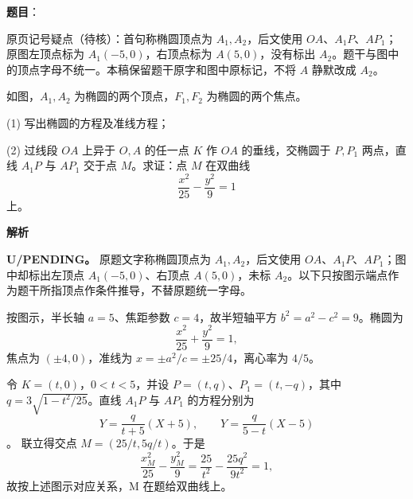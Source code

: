 \begin{answer}

\textbf{题目}：

\begin{gktip}
原页记号疑点（待核）：首句称椭圆顶点为 \(A_1,A_2\)，后文使用 \(OA\)、\(A_1P\)、\(AP_1\)；原图左顶点标为 \(A_1(-5,0)\)，右顶点标为 \(A(5,0)\)，没有标出 \(A_2\)。题干与图中的顶点字母不统一。本稿保留题干原字和图中原标记，不将 \(A\) 静默改成 \(A_2\)。
\end{gktip}

如图，\(A_1,A_2\) 为椭圆的两个顶点，\(F_1,F_2\) 为椭圆的两个焦点。

(1) 写出椭圆的方程及准线方程；

(2) 过线段 \(OA\) 上异于 \(O,A\) 的任一点 \(K\) 作 \(OA\) 的垂线，交椭圆于 \(P,P_1\) 两点，直线 \(A_1P\) 与 \(AP_1\) 交于点 \(M\)。求证：点 \(M\) 在双曲线
\nopagebreak[4]
\[
\frac{x^2}{25}-\frac{y^2}{9}=1
\]
上。
\nopagebreak[4]
\begin{center}\end{center}
\nopagebreak[4]
\textbf{解析}

\textbf{U/PENDING。} 原题文字称椭圆顶点为 \(A_1,A_2\)，后文使用 \(OA\)、\(A_1P\)、\(AP_1\)；图中却标出左顶点 \(A_1(-5,0)\)、右顶点 \(A(5,0)\)，未标 \(A_2\)。以下只按图示端点作为题干所指顶点作条件推导，不替原题统一字母。


按图示，半长轴 \(a=5\)、焦距参数 \(c=4\)，故半短轴平方 \(b^2=a^2-c^2=9\)。椭圆为
\nopagebreak[4]
\[
\frac{x^2}{25}+\frac{y^2}{9}=1,
\]
焦点为 \((\pm4,0)\)，准线为 \(x=\pm a^2/c=\pm25/4\)，离心率为 \(4/5\)。


令 \(K=(t,0)\)，\(0<t<5\)，并设 \(P=(t,q)\)、\(P_1=(t,-q)\)，其中 \(q=3\sqrt{1-t^2/25}\)。直线 \(A_1P\) 与 \(AP_1\) 的方程分别为
\nopagebreak[4]
\[
Y=\frac{q}{t+5}(X+5),\qquad Y=\frac{q}{5-t}(X-5)
\]
。
联立得交点 \(M=(25/t,5q/t)\)。于是
\nopagebreak[4]
\[
\frac{x_M^2}{25}-\frac{y_M^2}{9}=\frac{25}{t^2}-\frac{25q^2}{9t^2}=1,
\]
故按上述图示对应关系，M 在题给双曲线上。



\end{answer}
